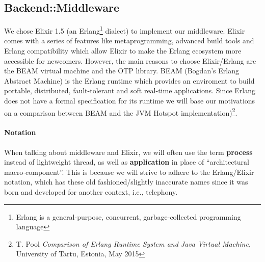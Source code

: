 \subsection{Backend::Middleware}
We chose Elixir 1.5 (an Erlang\footnote{Erlang is a general-purpose,
concurrent, garbage-collected programming language} dialect) to implement
our middleware. Elixir comes with a series of features like metaprogramming,
advanced build tools and Erlang compatibility which allow Elixir to make the
Erlang ecosystem more accessible for newcomers.
However, the main reasons to choose Elixir/Erlang are the BEAM virtual machine
and the OTP library.
BEAM (Bogdan's Erlang Abstract Machine) is the Erlang runtime which provides an
enviroment to build portable, distributed, fault-tolerant and soft real-time
applications.
Since Erlang does not have a formal specification for its runtime we will
base our motivations on a comparison between BEAM and the JVM Hotspot
implementation)\footnote{T. Pool \textit{Comparison of Erlang Runtime System
and Java Virtual Machine}, University of Tartu, Estonia, May 2015}.

\paragraph{Notation}
When talking about middleware and Elixir, we will often use the term
\textbf{process} instead of lightweight thread, as well as \textbf{application}
in place of ``architectural macro-component''.
This is because we will strive to adhere
to the Erlang/Elixir notation, which has these old fashioned/slightly inaccurate
names since it was born and developed for another context, i.e., telephony.

